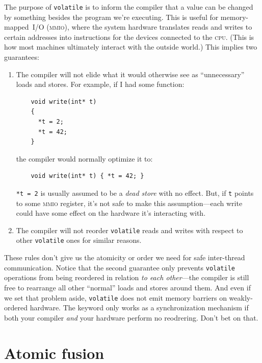 \documentclass[fontsize=10pt, numbers=endperiod]{scrartcl}
\newcommand{\codesize}{\fontsize{10pt}{12pt}}
\newcommand{\monobox}[1]{\mbox{\texttt{#1}}}
\newcommand{\keyword}[1]{\monobox{\color{darkGreen}#1}}
\newcommand{\introduce}[1]{\textit{#1}}
\newenvironment{colfigure}
  {\par\vspace{1\baselineskip minus 0.5\baselineskip}\noindent\minipage{\linewidth}}
  {\endminipage\vspace*{1\baselineskip minus 0.7\baselineskip}}
\begin{document}
\begin{multicols*}{2}
The purpose of \keyword{volatile} is to inform the compiler that a value can
be changed by something besides the program we're executing.
This is useful for memory-mapped~\textsc{I/O} \textsc{(mmio)},
where the system hardware translates reads and writes to certain addresses
into instructions for the devices connected to the \textsc{cpu}.
(This is how most machines ultimately interact with the outside world.)
This implies two guarantees:
\begin{enumerate}
\item The compiler will not elide what it would otherwise see as ``unnecessary''
    loads and stores. For example, if I had some function:
    \begin{colfigure}
    \begin{verbatim}
    void write(int* t)
    {
      *t = 2;
      *t = 42;
    }
    \end{verbatim}
    \end{colfigure}
    the compiler would normally optimize it to:
    \begin{verbatim}
    void write(int* t) { *t = 42; }
    \end{verbatim}
    \texttt{*t = 2} is usually assumed to be a
    \introduce{dead store} with no effect.
    But, if \texttt{t} points to some \textsc{mmio} register, it's not
    safe to make this assumption---each write could have some effect
    on the hardware it's interacting with.

\item The compiler will not reorder \keyword{volatile}
    reads and writes with respect to other \keyword{volatile} ones
    for similar reasons.
\end{enumerate}

These rules don't give us the atomicity or order we need for safe
inter-thread communication.
Notice that the second guarantee only prevents \keyword{volatile} operations
from being reordered in relation \emph{to each other}---the compiler is still
free to rearrange all other ``normal'' loads and stores around them.
And even if we set that problem aside,
\keyword{volatile} does not emit memory barriers on weakly-ordered hardware.
The keyword only works as a synchronization mechanism if both your compiler
\emph{and} your hardware perform no reodrering.
Don't bet on that.

\section{Atomic fusion}
\label{fusing}


\end{multicols*}
\end{document}
